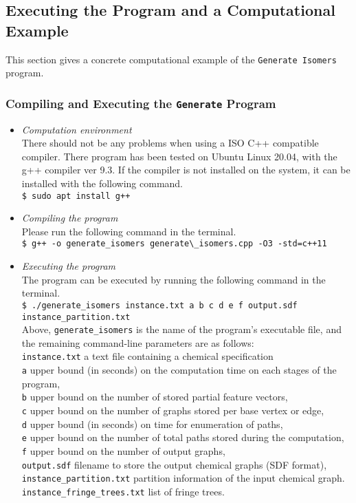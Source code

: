 \documentclass[11pt,titlepage,dvipdfmx,twoside]{article}
\begin{document}
\subsection{Executing the Program and a Computational Example}
\label{sec:Example_m}

This section gives a concrete computational example of the {\tt Generate Isomers} program.

\subsubsection{Compiling and Executing the {\tt Generate} Program}
\label{sec:compile_m}
\begin{itemize}
	\item {\em Computation environment}\\
		There should not be any problems when using a ISO C++ compatible compiler. %
		There program has been tested on 
		Ubuntu Linux 20.04,  with the  g++ compiler ver 9.3.
		If the compiler is not installed on the system, it can be installed with
		the following command.\\
		\verb|$ sudo apt install g++|
	\item {\em Compiling the program}\\
		Please run the following command in the terminal.\\
		\verb|$ g++ -o generate_isomers generate\_isomers.cpp -O3 -std=c++11|\\
	\item {\em Executing the program}\\
		The program can be executed by running the following command in the terminal.\\
		\verb|$ ./generate_isomers instance.txt a b c d e f output.sdf instance_partition.txt|\\
		Above, {\tt generate\_isomers} is the name of the program's executable file, and the remaining command-line
		parameters are as follows: \\
		\verb|instance.txt|  a text file containing a chemical specification \\
		\verb|a| upper bound (in seconds) on the computation time on each stages of the program, \\
		\verb|b| upper bound on the number of stored partial feature vectors, \\
		\verb|c| upper bound on the number of graphs stored per base vertex or edge, \\
		\verb|d| upper bound (in seconds) on time for enumeration of paths,\\
		\verb|e| upper bound on the number of total paths stored during the computation,\\
		\verb|f| upper bound on the number of output graphs, \\
		\verb|output.sdf| filename to store the output chemical graphs (SDF format), \\
		\verb|instance_partition.txt|  partition information of the input chemical graph.\\
		\verb|instance_fringe_trees.txt| list of fringe trees.\\
\end{itemize}
\end{document}
